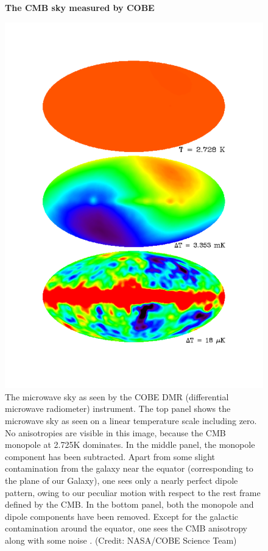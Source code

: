 \documentclass{article}
\begin{document}
\begin{figure}
\centering
    \textbf{The CMB sky measured by COBE}\par\medskip
\centering
\includegraphics[scale =0.3]{mono_di_cobe}
\caption{The microwave sky as seen by the COBE DMR (differential microwave radiometer) instrument. The top panel shows the microwave sky as seen on a linear temperature scale including zero. No anisotropies are visible in this image, because the CMB monopole at 2.725K dominates. In the middle panel, the monopole component has been subtracted. Apart from some slight contamination from the galaxy near the equator (corresponding to the plane of our Galaxy), one sees only a nearly perfect dipole pattern, owing to our peculiar motion with respect to the rest frame defined by the CMB. In the bottom panel, both the monopole and dipole components have been removed. Except for the galactic contamination around the equator, one sees the CMB anisotropy along with some noise \cite{bucherPhysicsCosmicMicrowave2015}. (Credit: NASA/COBE Science Team)}
\label{cobe_map}
\end{figure}
\end{document}
